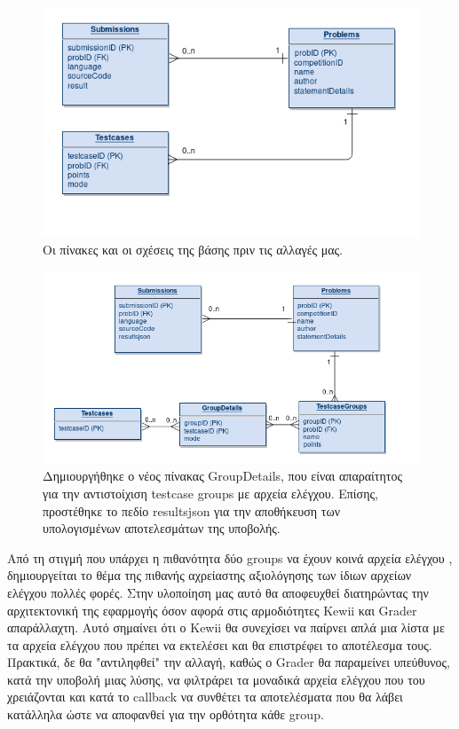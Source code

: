 \documentclass[diploma]{softlab-thesis}
\begin{document}
\begin{figure}
  \centering
  \includegraphics[scale=0.6,trim=4 4 4 4,clip]{Figures/groupsbefore.png}
  \caption[Βάση πριν τα testcase groups]{Οι πίνακες και οι σχέσεις της βάσης πριν
  τις αλλαγές μας.}
\end{figure}

\begin{figure}
  \centering
  \includegraphics[scale=0.6,trim=4 4 4 4,clip]{Figures/groupsafter.png}
  \caption[Βάση μετά τα testcase groups]{Δημιουργήθηκε ο νέος πίνακας GroupDetails,
  που είναι απαραίτητος για την αντιστοίχιση testcase groups με αρχεία ελέγχου.
  Επίσης, προστέθηκε το πεδίο resultsjson για την αποθήκευση των υπολογισμένων
  αποτελεσμάτων της υποβολής.}
\end{figure}

\bigskip

Από τη στιγμή που υπάρχει η πιθανότητα δύο groups να έχουν κοινά αρχεία ελέγχου
, δημιουργείται το θέμα της πιθανής αχρείαστης αξιολόγησης των ίδιων αρχείων
ελέγχου πολλές φορές. Στην υλοποίηση μας αυτό θα αποφευχθεί διατηρώντας την
αρχιτεκτονική της εφαρμογής όσον αφορά στις αρμοδιότητες Kewii και Grader
απαράλλαχτη. Αυτό σημαίνει ότι ο Kewii θα συνεχίσει να παίρνει απλά μια λίστα
με τα αρχεία ελέγχου που πρέπει να εκτελέσει και θα επιστρέφει το αποτέλεσμα
τους. Πρακτικά, δε θα "αντιληφθεί" την αλλαγή, καθώς ο Grader θα παραμείνει
υπεύθυνος, κατά την υποβολή μιας λύσης, να φιλτράρει τα μοναδικά αρχεία ελέγχου
που του χρειάζονται και κατά το callback να συνθέτει τα αποτελέσματα που θα
λάβει κατάλληλα ώστε να αποφανθεί για την ορθότητα κάθε group.
\end{document}
